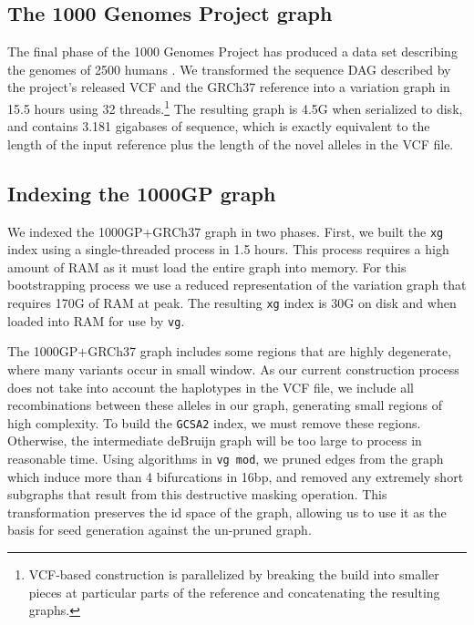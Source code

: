 \documentclass[12pt]{article}
\begin{document}
\subsection{The 1000 Genomes Project graph}

The final phase of the 1000 Genomes Project has produced a data set describing the genomes of 2500 humans \cite{1000g2015}.
We transformed the sequence DAG described by the project's released VCF and the GRCh37 reference into a variation graph in 15.5 hours using 32 threads.\footnote{VCF-based construction is parallelized by breaking the build into smaller pieces at particular parts of the reference and concatenating the resulting graphs.}
The resulting graph is 4.5G when serialized to disk, and contains 3.181 gigabases of sequence, which is exactly equivalent to the length of the input reference plus the length of the novel alleles in the VCF file.

\subsection{Indexing the 1000GP graph}

We indexed the 1000GP+GRCh37 graph in two phases.
First, we built the {\tt xg} index using a single-threaded process in 1.5 hours.
This process requires a high amount of RAM as it must load the entire graph into memory. For this bootstrapping process we use a reduced representation of the variation graph that requires 170G of RAM at peak.
The resulting {\tt xg} index is 30G on disk and when loaded into RAM for use by {\tt vg}.

The 1000GP+GRCh37 graph includes some regions that are highly degenerate, where many variants occur in small window.
As our current construction process does not take into account the haplotypes in the VCF file, we include all recombinations between these alleles in our graph, generating small regions of high complexity.
To build the {\tt GCSA2} index, we must remove these regions. Otherwise, the intermediate deBruijn graph will be too large to process in reasonable time.
Using algorithms in {\tt vg mod}, we pruned edges from the graph which induce more than 4 bifurcations in 16bp, and removed any extremely short subgraphs that result from this destructive masking operation.
This transformation preserves the id space of the graph, allowing us to use it as the basis for seed generation against the un-pruned graph.
\end{document}
